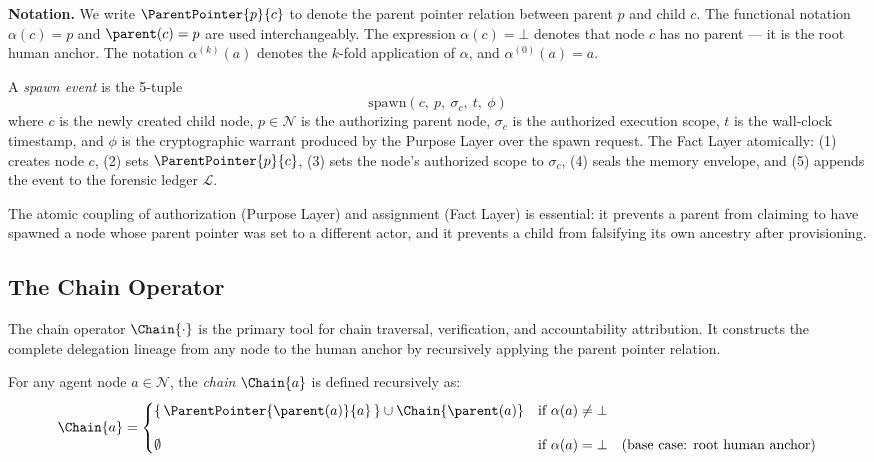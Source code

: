 \medskip
\noindent\textbf{Notation.} We write $\ParentPointer{p}{c}$ to denote the parent pointer relation between parent $p$ and child $c$. The functional notation $\alpha(c) = p$ and $\parent(c) = p$ are used interchangeably. The expression $\alpha(c) = \bot$ denotes that node $c$ has no parent --- it is the root human anchor. The notation $\alpha^{(k)}(a)$ denotes the $k$-fold application of $\alpha$, and $\alpha^{(0)}(a) = a$.

\medskip
\begin{dfn}
\label{dfn:spawn-event}
A \emph{spawn event} is the 5-tuple
\begin{equation}
\mathrm{spawn}(c,\ p,\ \sigma_c,\ t,\ \phi)
\end{equation}
where $c$ is the newly created child node, $p \in \mathcal{N}$ is the authorizing parent node, $\sigma_c$ is the authorized execution scope, $t$ is the wall-clock timestamp, and $\phi$ is the cryptographic warrant produced by the Purpose Layer over the spawn request. The Fact Layer atomically: (1) creates node $c$, (2) sets $\ParentPointer{p}{c}$, (3) sets the node's authorized scope to $\sigma_c$, (4) seals the memory envelope, and (5) appends the event to the forensic ledger $\mathcal{L}$.
\end{dfn}

The atomic coupling of authorization (Purpose Layer) and assignment (Fact Layer) is essential: it prevents a parent from claiming to have spawned a node whose parent pointer was set to a different actor, and it prevents a child from falsifying its own ancestry after provisioning.

\subsection{The Chain Operator}
\label{sec:chain-operator}

The chain operator $\Chain{\cdot}$ is the primary tool for chain traversal, verification, and accountability attribution. It constructs the complete delegation lineage from any node to the human anchor by recursively applying the parent pointer relation.

\begin{dfn}
\label{def:chain-operator}
For any agent node $a \in \mathcal{N}$, the \emph{chain} $\Chain{a}$ is defined recursively as:
\begin{equation}
\Chain{a} =
\begin{cases}
\{\,\ParentPointer{\parent(a)}{a}\,\} \cup \Chain{\parent(a)} & \text{if } \alpha(a) \neq \bot \\[10pt]
\emptyset & \text{if } \alpha(a) = \bot \quad \text{(base case: root human anchor)}
\end{cases}
\label{eq:chain-recursive}
\end{equation}
\end{dfn}

